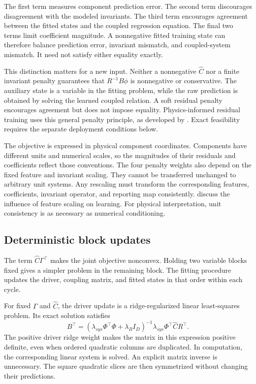 The first term measures component prediction error. The second term discourages disagreement with the modeled invariants. The third term encourages agreement between the fitted states and the coupled regression equation. The final two terms limit coefficient magnitude. A nonnegative fitted training state can therefore balance prediction error, invariant mismatch, and coupled-system mismatch. It need not satisfy either equality exactly.

This distinction matters for a new input. Neither a nonnegative \(\widehat C\) nor a finite invariant penalty guarantees that \(R^{-1}B\phi\) is nonnegative or conservative. The auxiliary state is a variable in the fitting problem, while the raw prediction is obtained by solving the learned coupled relation. A soft residual penalty encourages agreement but does not impose equality. Physics-informed residual training uses this general penalty principle, as developed by \citet{Raissi2019}. Exact feasibility requires the separate deployment conditions below.

The objective is expressed in physical component coordinates. Components have different units and numerical scales, so the magnitudes of their residuals and coefficients reflect those conventions. The four penalty weights also depend on the fixed feature and invariant scaling. They cannot be transferred unchanged to arbitrary unit systems. Any rescaling must transform the corresponding features, coefficients, invariant operator, and reporting map consistently. \citet{Pinheiro2025} discuss the influence of feature scaling on learning. For physical interpretation, unit consistency is as necessary as numerical conditioning.

\subsection{Deterministic block updates}

The term \(\widehat C\Gamma^\top\) makes the joint objective nonconvex. Holding two variable blocks fixed gives a simpler problem in the remaining block. The fitting procedure updates the driver, coupling matrix, and fitted states in that order within each cycle.

For fixed \(\Gamma\) and \(\widehat C\), the driver update is a ridge-regularized linear least-squares problem. Its exact solution satisfies
\begin{equation}
\label{eq:icsor_ridge_update}
B^\top=
\left(\lambda_{sys}\Phi^\top\Phi+\lambda_B I_D\right)^{-1}
\lambda_{sys}\Phi^\top\widehat C R^\top.
\end{equation}
The positive driver ridge weight makes the matrix in this expression positive definite, even when ordered quadratic columns are duplicated. In computation, the corresponding linear system is solved. An explicit matrix inverse is unnecessary. The square quadratic slices are then symmetrized without changing their predictions.

